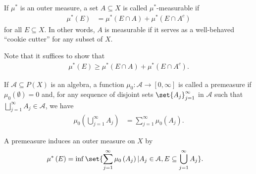 \documentclass[10pt]{mypackage}
\begin{document}
\begin{definition}
  If $\mu^{\ast}$ is an outer measure, a set $A\subseteq X$ is called $\mu^{\ast}$-measurable if
  \begin{align*}
    \mu^{\ast}\left(E\right) &= \mu^{\ast}\left(E\cap A\right) + \mu^{\ast}\left(E\cap A^{c}\right)
  \end{align*}
  for all $E\subseteq X$. In other words, $A$ is measurable if it serves as a well-behaved ``cookie cutter'' for any subset of $X$.\newline

  Note that it suffices to show that
  \begin{align*}
    \mu^{\ast}\left(E\right) \geq \mu^{\ast}\left(E\cap A\right) + \mu^{\ast}\left(E\cap A^{c}\right).
  \end{align*}
\end{definition}
\begin{definition}
  If $\mathcal{A}\subseteq P(X)$ is an algebra, a function $\mu_0\colon \mathcal{A}\rightarrow [0,\infty]$ is called a premeasure if $\mu_0\left( \emptyset \right) = 0$ and, for any sequence of disjoint sets $\set{A_j}_{j=1}^{\infty}$ in $\mathcal{A}$ such that $\bigsqcup_{j=1}^{\infty}A_j\in \mathcal{A}$, we have
  \begin{align*}
    \mu_0\left( \bigcup_{j=1}^{\infty}A_j \right) &= \sum_{j=1}^{\infty}\mu_0\left( A_j \right).
  \end{align*}
\end{definition}
A premeasure induces an outer measure on $X$ by
\begin{align*}
  \mu^{\ast}\left( E \right) &= \inf\set{\sum_{j=1}^{\infty}\mu_0\left( A_j \right) | A_j\in \mathcal{A},E\subseteq \bigcup_{j=1}^{\infty}A_j}.
\end{align*}
\end{document}
